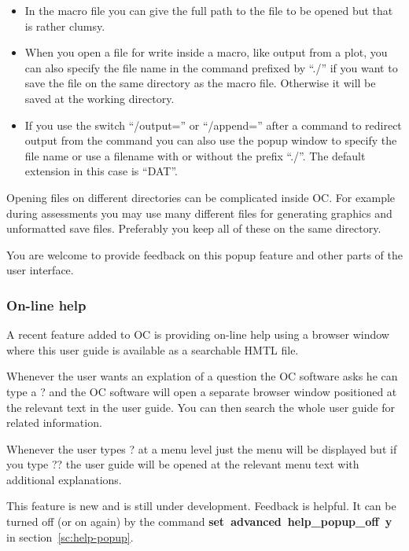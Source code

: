 \documentclass[11pt]{article}
\begin{document}
\begin{itemize}
\item In the macro file you can give the full path to the file to be
  opened but that is rather clumsy.

\item When you open a file for write inside a macro, like output from
  a plot, you can also specify the file name in the command prefixed
  by ``./'' if you want to save the file on the same directory as the
  macro file.  Otherwise it will be saved at the working directory.

\item If you use the switch ``/output='' or ``/append='' after a
  command to redirect output from the command you can also use the
  popup window to specify the file name or use a filename with or
  without the prefix ``./''.  The default extension in this case is ``DAT''.

\end{itemize}

Opening files on different directories can be complicated inside OC.
For example during assessments you may use many different files for
generating graphics and unformatted save files.  Preferably you keep
all of these on the same directory.

You are welcome to provide feedback on this popup feature and other
parts of the user interface.

\hypertarget{Info helpsystem}{}
\subsubsection{On-line help}\label{sc:on-line-help}

A recent feature added to OC is providing on-line help using a browser
window where this user guide is available as a searchable HMTL file.

Whenever the user wants an explation of a question the OC software
asks he can type a ? and the OC software will open a separate browser
window positioned at the relevant text in the user guide.  You can then
search the whole user guide for related information.

Whenever the user types ? at a menu level just the menu will be
displayed but if you type ?? the user guide will be opened at the
relevant menu text with additional explanations.

This feature is new and is still under development. Feedback is
helpful.  It can be turned off (or on again) by the command {\bf
  set~advanced~help\_popup\_off~y} in section~\ref{sc:help-popup}.
\end{document}
